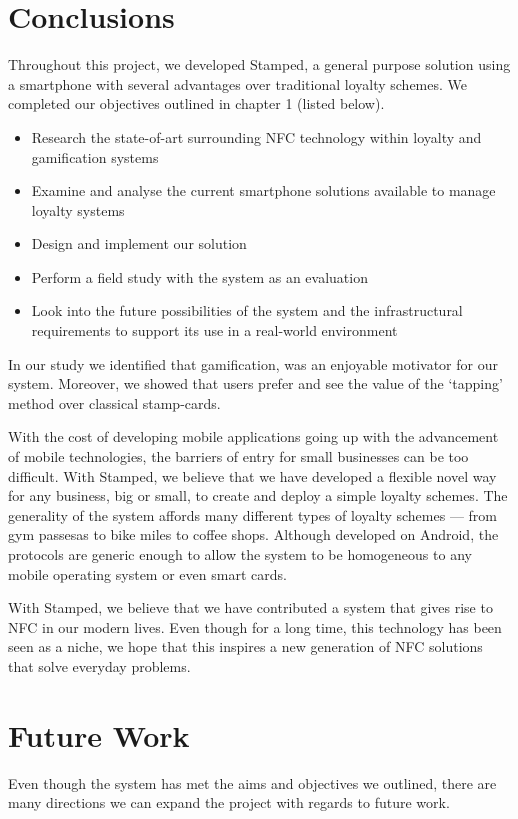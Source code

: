 \section{Conclusions}
Throughout this project, we developed Stamped, a general purpose solution using a smartphone with several advantages over traditional loyalty schemes. We completed our objectives outlined in chapter 1 (listed below).
\begin{itemize}
    \item Research the state-of-art surrounding NFC technology within loyalty and gamification systems
    \item Examine and analyse the current smartphone solutions available to manage loyalty systems
    \item Design and implement our solution
    \item Perform a field study with the system as an evaluation
    \item Look into the future possibilities of the system and the infrastructural requirements to support its use in a real-world environment
\end{itemize}

In our study we identified that gamification, was an enjoyable motivator for our system. Moreover, we showed that users prefer and see the value of the `tapping' method over classical stamp-cards.

With the cost of developing mobile applications going up with the advancement of mobile technologies, the barriers of entry for small businesses can be too difficult. With Stamped, we believe that we have developed a flexible novel way for any business, big or small, to create and deploy a simple loyalty schemes. The generality of the system affords many different types of loyalty schemes --- from gym passesas to bike miles to coffee shops. Although developed on Android, the protocols are generic enough to allow the system to be homogeneous to any mobile operating system or even smart cards.

With Stamped, we believe that we have contributed a system that gives rise to NFC in our modern lives. Even though for a long time, this technology has been seen as a niche, we hope that this inspires a new generation of NFC solutions that solve everyday problems.

\section{Future Work}
Even though the system has met the aims and objectives we outlined, there are many directions we can expand the project with regards to future work.
\newpage
